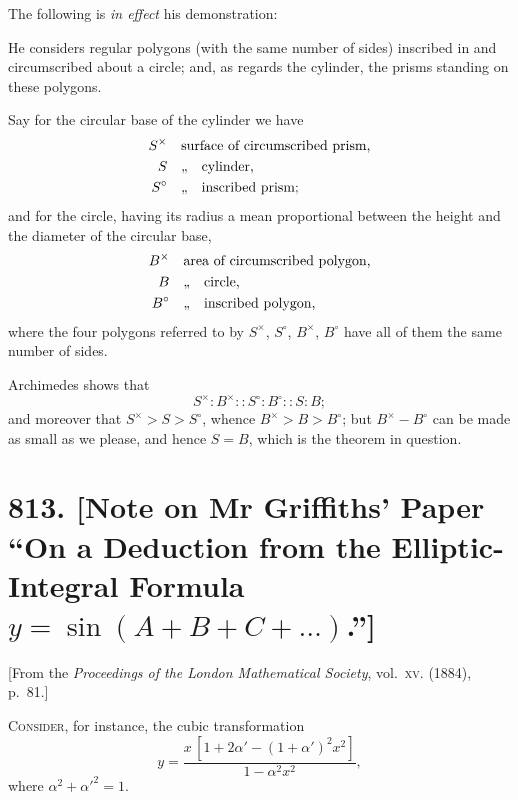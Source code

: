 \documentclass[11pt,a4paper]{book}
\begin{document}
The following is \textit{in effect} his demonstration:

He considers regular polygons (with the same number of sides) inscribed in and circumscribed about a circle; and, as regards the cylinder, the prisms standing on these polygons.

Say for the circular base of the cylinder we have
\begin{align*}
S^{\times} &\quad \text{surface of circumscribed prism,}\\
S &\quad \text{,,\quad cylinder,}\\
S^{\circ} &\quad \text{,,\quad inscribed prism;}
\end{align*}
and for the circle, having its radius a mean proportional between the height and the diameter of the circular base,
\begin{align*}
B^{\times} &\quad \text{area of circumscribed polygon,}\\
B &\quad \text{,,\quad circle,}\\
B^{\circ} &\quad \text{,,\quad inscribed polygon,}
\end{align*}
where the four polygons referred to by $S^{\times}$, $S^{\circ}$, $B^{\times}$, $B^{\circ}$ have all of them the same number of sides.

Archimedes shows that
\[
S^{\times} : B^{\times} :: S^{\circ} : B^{\circ} :: S : B;
\]
and moreover that $S^{\times} > S > S^{\circ}$, whence $B^{\times} > B > B^{\circ}$; but $B^{\times} - B^{\circ}$ can be made as small as we please, and hence $S = B$, which is the theorem in question.


\newpage
\section*{813. [Note on Mr Griffiths' Paper ``On a Deduction from the Elliptic-Integral Formula $y = \sin{(A+B+C+\ldots)}$.'']}

\begin{center}
\small[From the \textit{Proceedings of the London Mathematical Society}, vol.~\textsc{xv}. (1884), p.~81.]
\end{center}

\bigskip

\noindent
\textsc{Consider}, for instance, the cubic transformation
\[
y = \frac{x\,[1 + 2\alpha' - (1+\alpha')^2 x^2]}{1 - \alpha^2 x^2},
\]
where $\alpha^2 + \alpha'^2 = 1$.
\end{document}
